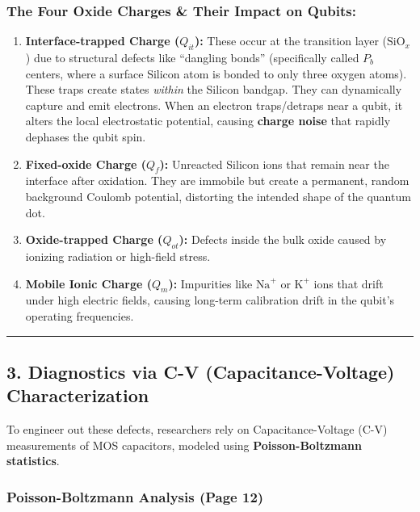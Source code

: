 \documentclass[
]{article}
\providecommand{\tightlist}{%
  \setlength{\itemsep}{0pt}\setlength{\parskip}{0pt}}
\begin{document}
\subsubsection{The Four Oxide Charges \& Their Impact on
Qubits:}\label{the-four-oxide-charges-their-impact-on-qubits}

\begin{enumerate}
\def\labelenumi{\arabic{enumi}.}
\tightlist
\item
  \textbf{Interface-trapped Charge (\(Q_{it}\)):} These occur at the
  transition layer (\(\text{SiO}_x\)) due to structural defects like
  ``dangling bonds'' (specifically called \(P_b\) centers, where a
  surface Silicon atom is bonded to only three oxygen atoms). These
  traps create states \emph{within} the Silicon bandgap. They can
  dynamically capture and emit electrons. When an electron traps/detraps
  near a qubit, it alters the local electrostatic potential, causing
  \textbf{charge noise} that rapidly dephases the qubit spin.
\item
  \textbf{Fixed-oxide Charge (\(Q_f\)):} Unreacted Silicon ions that
  remain near the interface after oxidation. They are immobile but
  create a permanent, random background Coulomb potential, distorting
  the intended shape of the quantum dot.
\item
  \textbf{Oxide-trapped Charge (\(Q_{ot}\)):} Defects inside the bulk
  oxide caused by ionizing radiation or high-field stress.
\item
  \textbf{Mobile Ionic Charge (\(Q_m\)):} Impurities like
  \(\text{Na}^+\) or \(\text{K}^+\) ions that drift under high electric
  fields, causing long-term calibration drift in the qubit's operating
  frequencies.
\end{enumerate}

\begin{center}\rule{0.5\linewidth}{0.5pt}\end{center}

\subsection{3. Diagnostics via C-V (Capacitance-Voltage)
Characterization}\label{diagnostics-via-c-v-capacitance-voltage-characterization}

To engineer out these defects, researchers rely on Capacitance-Voltage
(C-V) measurements of MOS capacitors, modeled using
\textbf{Poisson-Boltzmann statistics}.

\subsubsection{Poisson-Boltzmann Analysis (Page
12)}\label{poisson-boltzmann-analysis-page-12}
\end{document}
